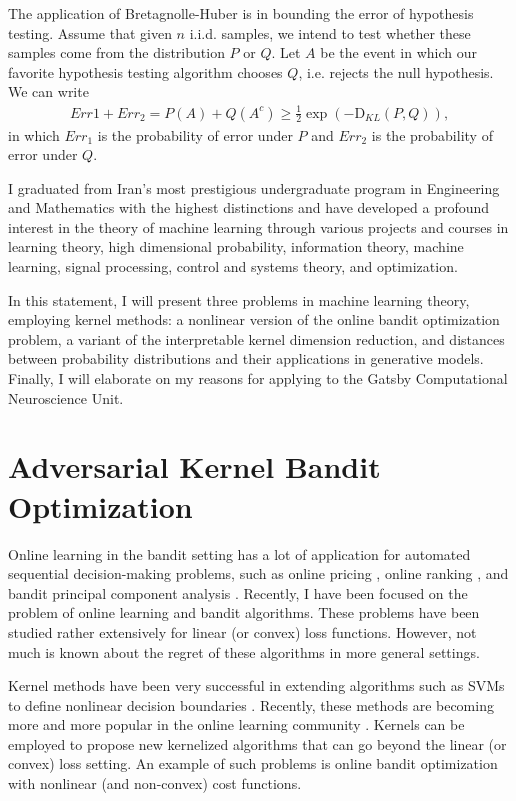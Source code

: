 \documentclass[]{article}
\newcommand{\KL}{\mathrm{D}_{KL}}
\begin{document}
The application of Bretagnolle-Huber is in bounding the error of hypothesis testing. Assume that given $n$ i.i.d. samples, we intend to test whether these samples come from the distribution $P$ or $Q$. Let $A$ be the event in which our favorite hypothesis testing algorithm chooses $Q$, i.e. rejects the null hypothesis. We can write
\begin{align}
	Err1 + Err_2 = P(A) + Q(A^c) \geq \frac{1}{2}\exp(-\KL(P, Q)),
\end{align}
in which $Err_1$ is the probability of error under $P$ and $Err_2$ is the probability of error under $Q$.


\newpage

I graduated from Iran's most prestigious undergraduate program in Engineering and Mathematics with the highest distinctions and have developed a profound interest in the theory of machine learning through various projects and courses in learning theory, high dimensional probability, information theory, machine learning, signal processing, control and systems theory, and optimization.


In this statement, I will present three problems in machine learning theory,  employing kernel methods:  a nonlinear version of the online bandit optimization problem,  a variant of the interpretable kernel dimension reduction, and distances between probability distributions and their applications in generative models. Finally, I will elaborate on my reasons for applying to the Gatsby Computational Neuroscience Unit.


\section{Adversarial Kernel Bandit Optimization}
Online learning in the bandit setting has a lot of application for automated sequential decision-making problems, such as online pricing \cite{onlinepricing}, online ranking \cite{onlineranking}, and bandit principal component analysis \cite{onlinepca}. Recently, I have been focused on the problem of online learning and bandit algorithms. These problems have been studied rather extensively for linear (or convex) loss functions. However, not much is known about the regret of these algorithms in more general settings. 

Kernel methods have been very successful in extending algorithms such as SVMs to define nonlinear decision boundaries \cite{mohri}. Recently, these methods are becoming more and more popular in the online learning community \cite{JMLR:v17:14-148, Pacchiano2019}. Kernels can be employed to propose new kernelized algorithms that can go beyond the linear (or convex) loss setting. An example of such problems is online bandit optimization with nonlinear (and non-convex) cost functions.
\end{document}
